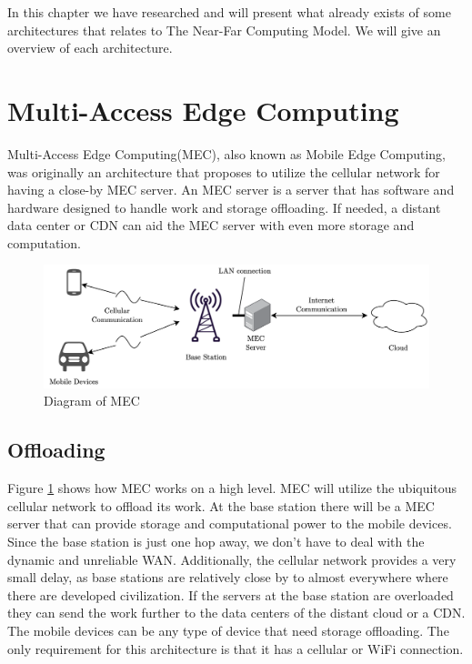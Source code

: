 
In this chapter we have researched and will present what already exists of some architectures that relates to The Near-Far Computing Model. We will give an overview of each architecture.




\section{Multi-Access Edge Computing}\label{section:MEC_architecture}
Multi-Access Edge Computing(MEC), also known as Mobile Edge Computing, was originally an architecture that proposes to utilize the cellular network for having a close-by MEC server\cite{porambage_survey_2018}. An MEC server is a server that has software and hardware designed to handle work and storage offloading. If needed, a distant data center or CDN can aid the MEC server with even more storage and computation.
\begin{figure}[t]
    \centering
    \includegraphics[scale=0.75]{chapters/4_architectures/figures/MEC.png}
    \caption{Diagram of MEC}
    \label{fig:MEC}
\end{figure}

\subsection{Offloading}
Figure \ref{fig:MEC} shows how MEC works on a high level. MEC will utilize the ubiquitous cellular network to offload its work. At the base station there will be a MEC server that can provide storage and computational power to the mobile devices. Since the base station is just one hop away, we don't have to deal with the dynamic and unreliable WAN. Additionally, the cellular network provides a very small delay, as base stations are relatively close by to almost everywhere where there are developed civilization. If the servers at the base station are overloaded they can send the work further to the data centers of the distant cloud or a CDN. The mobile devices can be any type of device that need storage offloading. The only requirement for this architecture is that it has a cellular or WiFi connection.

